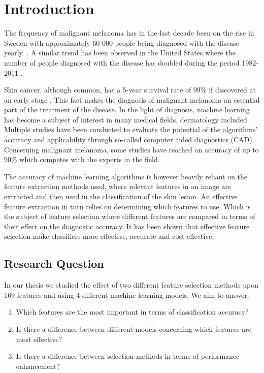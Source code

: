 \documentclass{kththesis}
\begin{document}
\tableofcontents


\mainmatter


\chapter{Introduction}
The frequency of malignant melanoma has in the last decade been on the rise in Sweden with approximately 60 000 people being diagnosed with the disease yearly. \parencite{sverige-hudcancer}.
A similar trend has been observed in the United States where the number of people diagnosed with the disease has doubled during the period 1982-2011 \parencite{aad-skin-cancer}.

Skin cancer, although common, has a 5-year survival rate of 99\% if discovered at an early stage \parencite{skincancer_org_2019}.
This fact makes the diagnosis of malignant melanoma an essential part of the treatment of the disease. In the light of diagnosis, machine learning has become a subject of interest in many medical fields, dermatology included. Multiple studies have been conducted to evaluate the potential of the algorithms’ accuracy and applicability through so-called computer aided diagnostics (CAD). Concerning malignant melanoma, some studies have reached an accuracy of up to 90\% which competes with the experts in the field. %

The accuracy of machine learning algorithms is however heavily reliant on the feature extraction methods used, where relevant features in an image are extracted and then used in the classification of the skin lesion. An effective feature extraction in turn relies on determining which features to use. Which is the subject of feature selection where different features are compared in terms of their effect on the diagnostic accuracy. It has been shown that effective feature selection make classifiers more effective, accurate and cost-effective. \parencite{KarabulutEsraMahsereci2012Acso}

\section{Research Question}
In our thesis we studied the effect of two different feature selection methods upon 169 features and using 4 different machine learning models. We aim to answer: %
\begin{enumerate}
    \item Which features are the most important in terms of classification accuracy?
    \item Is there a difference between different models concerning which features are most effective?
    \item Is there a difference between selection methods in terms of performance enhancement?
\end{enumerate}
\end{document}
